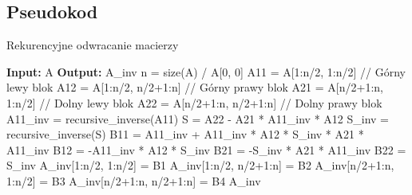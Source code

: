 \documentclass[11pt, leqno]{scrartcl}
\begin{document}
    \subsection{Pseudokod}
    \begin{algorithm}[H]
        \caption{Rekurencyjne odwracanie macierzy}
        \begin{algorithmic}
            \State \textbf{Input:} A
            \State \textbf{Output:} A\_inv
                \State n = size(A)
                    \State {} / A[0, 0]
                \EndIf
                \State
                \State A11 = A[1:n/2, 1:n/2]      // Górny lewy blok
                \State A12 = A[1:n/2, n/2+1:n]    // Górny prawy blok
                \State A21 = A[n/2+1:n, 1:n/2]    // Dolny lewy blok
                \State A22 = A[n/2+1:n, n/2+1:n]  // Dolny prawy blok
                \State
                \State A11\_inv = recursive\_inverse(A11)
                \State S = A22 - A21 * A11\_inv * A12
                \State S\_inv = recursive\_inverse(S)
                \State
                \State B11 = A11\_inv + A11\_inv * A12 * S\_inv * A21 * A11\_inv
                \State B12 = -A11\_inv * A12 * S\_inv
                \State B21 = -S\_inv * A21 * A11\_inv
                \State B22 = S\_inv
                \State
                \State A\_inv[1:n/2, 1:n/2] = B1
                \State A\_inv[1:n/2, n/2+1:n] = B2
                \State A\_inv[n/2+1:n, 1:n/2] = B3
                \State A\_inv[n/2+1:n, n/2+1:n] = B4
                \State \Return A\_inv
            \EndFunction
        \end{algorithmic}
    \end{algorithm}
\end{document}
